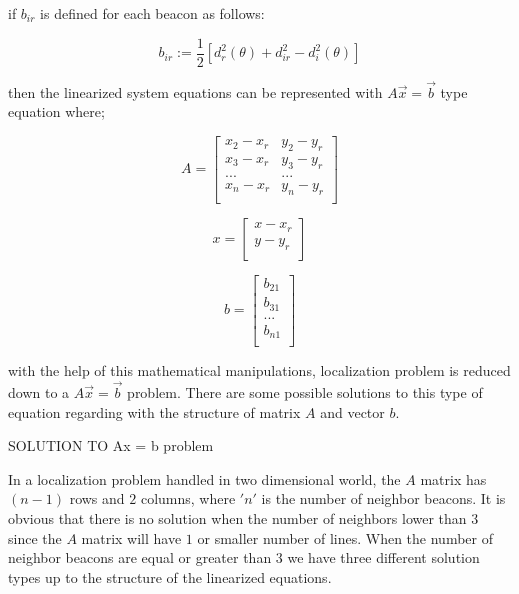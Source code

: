 \documentclass[twoside]{article}
\begin{document}
\begin{multicols}{2}
if $b_{ir}$ is defined for each beacon as follows:

\begin{equation}
  b_{ir} := \frac{1}{2}[d_r^2(\theta) + d_{ir}^2 - d_i^2(\theta)]
\end{equation}

then the linearized system equations can be represented with $A\vec{x} = \vec{b}$ type equation where;

\begin{equation}
			A = \begin{bmatrix}
			x_2 - x_r & y_2 - y_r\\
			x_3 - x_r & y_3 - y_r\\
			...       & ...      \\
			x_n - x_r & y_n - y_r\\
			\end{bmatrix}				
\end{equation}

\begin{equation}
		x = \begin{bmatrix}
		x - x_r\\
		y - y_r\\
		\end{bmatrix}
\end{equation}

\begin{equation}
b = \begin{bmatrix}
b_{21}\\
b_{31}\\
... \\
b_{n1}\\
\end{bmatrix}
\end{equation}


with the help of this mathematical manipulations, localization problem is reduced down to a $A\vec{x} = \vec{b}$ problem.
There are some possible solutions to this type of equation regarding with the structure of matrix $A$ and vector $b$.

SOLUTION TO Ax = b problem

In a localization problem handled in two dimensional world, the $A$ matrix has $(n-1)$ rows and $2$ columns, where $'n'$ is the number of neighbor beacons. It is obvious that there is no solution when the number of neighbors lower than $3$ since the $A$ matrix will have $1$ or smaller number of lines. When the number of neighbor beacons are equal or greater than $3$
we have three different solution types up to the structure of the linearized equations. 


\end{multicols}
\end{document}
